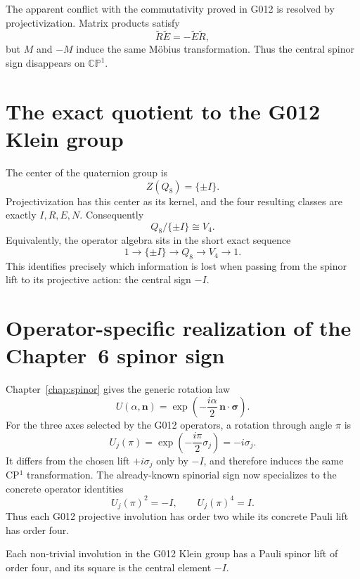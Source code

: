 The apparent conflict with the commutativity proved in G012 is resolved by
projectivization.  Matrix products satisfy
\[
 \widetilde R\widetilde E
 =-\widetilde E\widetilde R,
\]
but \(M\) and \(-M\) induce the same Möbius transformation.  Thus the central
spinor sign disappears on \(\mathbb{CP}^1\).

\section{The exact quotient to the G012 Klein group}

The center of the quaternion group is
\[
 Z(Q_8)=\{\pm I\}.
\]
Projectivization has this center as its kernel, and the four resulting classes
are exactly \(I,R,E,N\).  Consequently
\begin{equation}
 \boxed{Q_8/\{\pm I\}\cong V_4.}
 \label{eq:g013-q8-v4}
\end{equation}
Equivalently, the operator algebra sits in the short exact sequence
\begin{equation}
 \boxed{
 1\longrightarrow\{\pm I\}
 \longrightarrow Q_8
 \longrightarrow V_4
 \longrightarrow1.
 }
 \label{eq:g013-short-exact}
\end{equation}
This identifies precisely which information is lost when passing from the
spinor lift to its projective action: the central sign \(-I\).

\section{Operator-specific realization of the Chapter~6 spinor sign}

Chapter~\ref{chap:spinor} gives the generic rotation law
\[
 U(\alpha,\mathbf n)
 =\exp\!\left(-\frac{i\alpha}{2}\,\mathbf n\cdot\boldsymbol\sigma\right).
\]
For the three axes selected by the G012 operators, a rotation through angle
\(\pi\) is
\[
 U_j(\pi)
 =\exp\!\left(-\frac{i\pi}{2}\sigma_j\right)
 =-i\sigma_j.
\]
It differs from the chosen lift \(+i\sigma_j\) only by \(-I\), and therefore
induces the same CP$^1$ transformation.  The already-known spinorial sign now
specializes to the concrete operator identities
\[
 U_j(\pi)^2=-I,
 \qquad
 U_j(\pi)^4=I.
\]
Thus each G012 projective involution has order two while its concrete Pauli
lift has order four.

\begin{corollary}
Each non-trivial involution in the G012 Klein group has a Pauli spinor lift of
order four, and its square is the central element \(-I\).
\end{corollary}

